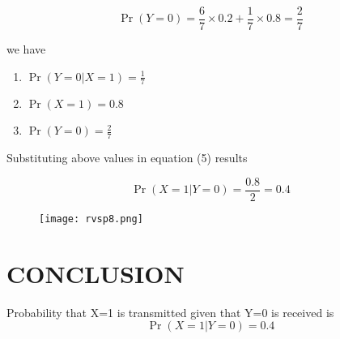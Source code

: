 \documentclass[journal,12pt,twocolumn]{IEEEtran}
\begin{document}
\begin{equation}
 \Pr{(Y=0)}= \frac{6}{7}\times 0.2+\frac{1}{7}\times 0.8=\frac{2}{7}
\end{equation}

we have
\begin{enumerate}
    \item $\Pr{(Y=0|X=1)}=\frac{1}{7}$
    \item $\Pr{(X=1)}=0.8$
    \item $\Pr{(Y=0)}=\frac{2}{7}$
\end{enumerate}
Substituting above values in equation (5) results

\begin{equation}
 \Pr{(X=1|Y=0)}=\frac{0.8}{2}=0.4
\end{equation}

\begin{figure}
    \centering
    \texttt{[image: rvsp8.png]}
\end{figure}

\section{\textbf{CONCLUSION}}
Probability that X=1 is transmitted given that Y=0 is received is
\begin{equation}
    \Pr{(X=1|Y=0)}=0.4
\end{equation}
\end{document}
